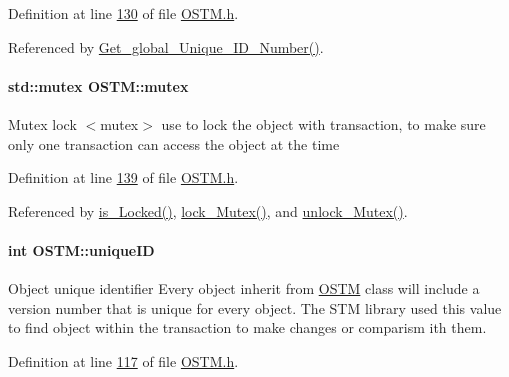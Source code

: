 Definition at line \hyperlink{_o_s_t_m_8h_source_l00130}{130} of file \hyperlink{_o_s_t_m_8h_source}{O\+S\+T\+M.\+h}.



Referenced by \hyperlink{_o_s_t_m_8cpp_source_l00061}{Get\+\_\+global\+\_\+\+Unique\+\_\+\+I\+D\+\_\+\+Number()}.

\paragraph[{\texorpdfstring{mutex}{mutex}}]{\setlength{\rightskip}{0pt plus 5cm}std\+::mutex O\+S\+T\+M\+::mutex\hspace{0.3cm}{\ttfamily [private]}}\hypertarget{class_o_s_t_m_aaab0921fd1564b793f882a5002ec7106_aaab0921fd1564b793f882a5002ec7106}{}\label{class_o_s_t_m_aaab0921fd1564b793f882a5002ec7106_aaab0921fd1564b793f882a5002ec7106}
Mutex lock $<$mutex$>$ use to lock the object with transaction, to make sure only one transaction can access the object at the time 

Definition at line \hyperlink{_o_s_t_m_8h_source_l00139}{139} of file \hyperlink{_o_s_t_m_8h_source}{O\+S\+T\+M.\+h}.



Referenced by \hyperlink{_o_s_t_m_8cpp_source_l00162}{is\+\_\+\+Locked()}, \hyperlink{_o_s_t_m_8cpp_source_l00147}{lock\+\_\+\+Mutex()}, and \hyperlink{_o_s_t_m_8cpp_source_l00154}{unlock\+\_\+\+Mutex()}.

\paragraph[{\texorpdfstring{unique\+ID}{uniqueID}}]{\setlength{\rightskip}{0pt plus 5cm}int O\+S\+T\+M\+::unique\+ID\hspace{0.3cm}{\ttfamily [private]}}\hypertarget{class_o_s_t_m_aa9fe59368b701af7f70befa23bd6901a_aa9fe59368b701af7f70befa23bd6901a}{}\label{class_o_s_t_m_aa9fe59368b701af7f70befa23bd6901a_aa9fe59368b701af7f70befa23bd6901a}
Object unique identifier Every object inherit from \hyperlink{class_o_s_t_m}{O\+S\+TM} class will include a version number that is unique for every object. The S\+TM library used this value to find object within the transaction to make changes or comparism ith them. 

Definition at line \hyperlink{_o_s_t_m_8h_source_l00117}{117} of file \hyperlink{_o_s_t_m_8h_source}{O\+S\+T\+M.\+h}.



